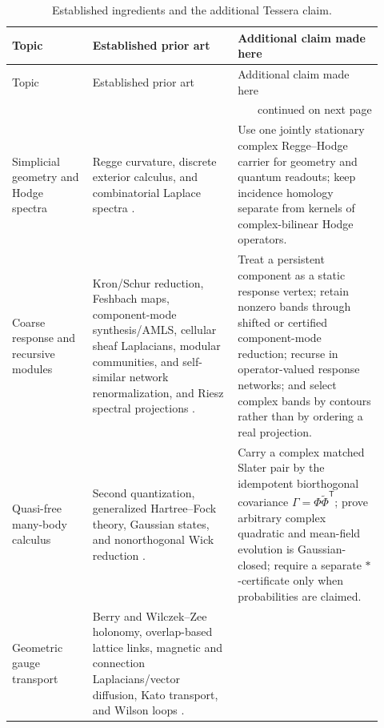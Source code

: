 \documentclass[11pt,letterpaper]{article}
\begin{document}
\begingroup\small
\setlength{\tabcolsep}{5pt}
\setlength{\LTleft}{0pt}\setlength{\LTright}{0pt}
\begin{longtable}{p{0.2\linewidth}p{0.36\linewidth}p{0.36\linewidth}}
\caption{Established ingredients and the additional Tessera claim.}
\label{tab:priorart}\\
\toprule
Topic & Established prior art & Additional claim made here\\
\midrule
\endfirsthead
\toprule
Topic & Established prior art & Additional claim made here\\
\midrule
\endhead
\midrule
\multicolumn{3}{r}{\footnotesize continued on next page}\\
\endfoot
\bottomrule
\endlastfoot
Simplicial geometry and Hodge spectra &
Regge curvature, discrete exterior calculus, and combinatorial Laplace spectra
\cite{regge1961,dec2005,horakjost2013}. &
Use one jointly stationary complex Regge--Hodge carrier for geometry and
quantum readouts; keep incidence homology separate from kernels of
complex-bilinear Hodge operators.\\
\addlinespace
Coarse response and recursive modules &
Kron/Schur reduction, Feshbach maps, component-mode synthesis/AMLS, cellular
sheaf Laplacians, modular communities, and self-similar network
renormalization, and Riesz spectral projections
\cite{craigbampton1968,bennighoflehoucq2004,bcfs2003,dorflerbullo2013,%
hansenghrist2019,reichardtbornholdt2006,songhavlin2005,fortunatobarthelemy2007,%
kato1995}. &
Treat a persistent component as a static response vertex; retain nonzero bands
through shifted or certified component-mode reduction; recurse in
operator-valued response networks; and select complex bands by contours rather
than by ordering a real projection.\\
\addlinespace
Quasi-free many-body calculus &
Second quantization, generalized Hartree--Fock theory, Gaussian states, and
nonorthogonal Wick reduction \cite{berezin1966,bls1994,burton2021}. &
Carry a complex matched Slater pair by the idempotent biorthogonal covariance
$\Gamma=\Phi\widetilde\Phi^{\mathsf T}$; prove arbitrary complex quadratic and
mean-field evolution is Gaussian-closed; require a separate $*$-certificate
only when probabilities are claimed.\\
\addlinespace
Geometric gauge transport &
Berry and Wilczek--Zee holonomy, overlap-based lattice links, magnetic and
connection Laplacians/vector diffusion, Kato transport, and Wilson loops
\cite{berry1984,wilczekzee1984,fukui2005,wilson1974,singerwu2012,%
liebloss1993,fanuel2017,kato1995}. &

\end{longtable}
\end{document}
